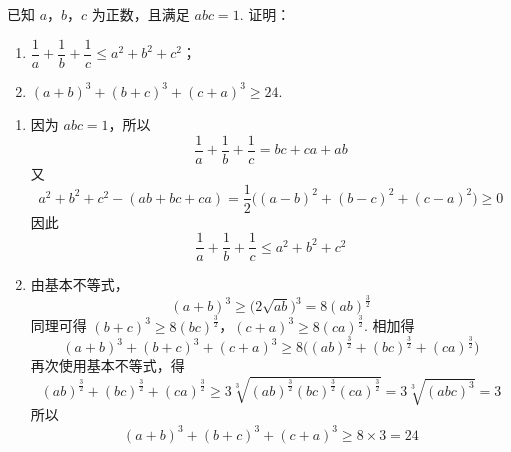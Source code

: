 \begin{problem}
已知 \(a\)，\(b\)，\(c\) 为正数，且满足 \( abc=1 \). 证明：

\begin{enumerate}
\item \( \dfrac{1}{a}+\dfrac{1}{b}+\dfrac{1}{c}\le a^2+b^2+c^2 \)；
\item \( (a+b)^3+(b+c)^3+(c+a)^3\ge 24 \).
\end{enumerate}
\end{problem}

\begin{solution}
\begin{enumerate}
\item 因为 \(abc=1\)，所以
\[
\frac1a+\frac1b+\frac1c=bc+ca+ab
\]
又
\[
a^2+b^2+c^2-(ab+bc+ca)
=\frac12\bigl((a-b)^2+(b-c)^2+(c-a)^2\bigr)\ge0
\]
因此
\[
\frac1a+\frac1b+\frac1c\le a^2+b^2+c^2
\]

\item 由基本不等式，
\[
(a+b)^3\ge\bigl(2\sqrt{ab}\bigr)^3=8(ab)^{\frac{3}{2}}
\]
同理可得
\((b+c)^3\ge8(bc)^{\frac{3}{2}}\)，\((c+a)^3\ge8(ca)^{\frac{3}{2}}\).
相加得
\[
(a+b)^3+(b+c)^3+(c+a)^3
\ge8\bigl((ab)^{\frac{3}{2}}+(bc)^{\frac{3}{2}}+(ca)^{\frac{3}{2}}\bigr)
\]
再次使用基本不等式，得
\[
(ab)^{\frac{3}{2}}+(bc)^{\frac{3}{2}}+(ca)^{\frac{3}{2}}
\ge3\sqrt[3]{(ab)^{\frac{3}{2}}(bc)^{\frac{3}{2}}(ca)^{\frac{3}{2}}}
=3\sqrt[3]{(abc)^3}=3
\]
所以
\[
(a+b)^3+(b+c)^3+(c+a)^3\ge8\times3=24
\]
\end{enumerate}
\end{solution}
